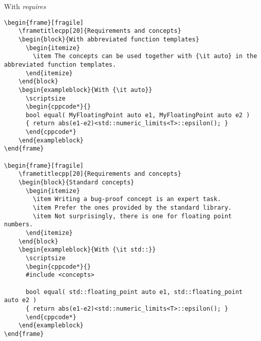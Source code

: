 \begin{frame}[fragile]
\begin{exampleblock}{With {\it requires}}
\begin{verbatim}
\begin{frame}[fragile]
    \frametitlecpp[20]{Requirements and concepts}
    \begin{block}{With abbreviated function templates}
      \begin{itemize}
        \item The concepts can be used together with {\it auto} in the abbreviated function templates.
      \end{itemize}
    \end{block}
    \begin{exampleblock}{With {\it auto}}
      \scriptsize
      \begin{cppcode*}{}
      bool equal( MyFloatingPoint auto e1, MyFloatingPoint auto e2 )
      { return abs(e1-e2)<std::numeric_limits<T>::epsilon(); }
      \end{cppcode*}
    \end{exampleblock}
\end{frame}

\begin{frame}[fragile]
    \frametitlecpp[20]{Requirements and concepts}
    \begin{block}{Standard concepts}
      \begin{itemize}
        \item Writing a bug-proof concept is an expert task.
        \item Prefer the ones provided by the standard library.
        \item Not surprisingly, there is one for floating point numbers.
      \end{itemize}
    \end{block}
    \begin{exampleblock}{With {\it std::}}
      \scriptsize
      \begin{cppcode*}{}
      #include <concepts>

      bool equal( std::floating_point auto e1, std::floating_point auto e2 )
      { return abs(e1-e2)<std::numeric_limits<T>::epsilon(); }
      \end{cppcode*}
    \end{exampleblock}
\end{frame}


\end{verbatim}
\end{exampleblock}
\end{frame}
